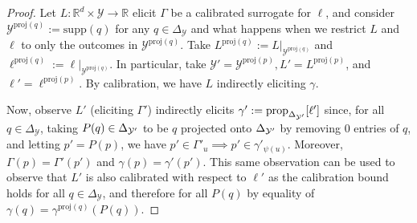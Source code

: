 \documentclass[anon,12pt]{colt2021} %
\newcommand{\reals}{\mathbb{R}}
\newcommand{\simplex}{\Delta_\Y}
\newcommand{\prop}[2][\mathcal{P}]{\mathrm{prop}_{#1}[#2]}
\newcommand{\proj}{\mathrm{proj}}
\newcommand{\supp}{\mathrm{supp}}
\newcommand{\Y}{\mathcal{Y}}
\begin{document}
\hariresult*
\begin{proof}
	Let $L : \reals^d \times \Y \to \reals$ elicit $\Gamma$ be a calibrated surrogate for $\ell$, and consider $\Y^{\proj(q)} := \supp(q)$ for any $q \in \simplex$ and what happens when we restrict $L$ and $\ell$ to only the outcomes in $\Y^{\proj(q)}$.
	Take $L^{\proj(q)} := L|_{\Y^{\proj(q)}}$ and $\ell^{\proj(q)} := \ell|_{\Y^{\proj(q)}}$.
	In particular, take $\Y' = \Y^{\proj(p)}, L' = L^{\proj(p)}$, and $\ell' = \ell^{\proj(p)}$. 
	By calibration, we have $L$ indirectly eliciting $\gamma$.
	
	
	Now, observe $L'$ (eliciting $\Gamma'$) indirectly elicits $\gamma' := \prop[\simplexp]{\ell'}$ since, for all $q \in \simplex$, taking $P(q) \in \simplexp$ to be $q$ projected onto $\simplexp$ by removing $0$ entries of $q$, and letting $p' = P(p)$, we have $p' \in \Gamma'_u \implies p' \in \gamma'_{\psi(u)}$.
	Moreover, $\Gamma(p) = \Gamma'(p')$ and $\gamma(p) = \gamma'(p')$.
	This same observation can be used to observe that $L'$ is also calibrated with respect to $\ell'$ as the calibration bound holds for all $q \in \simplex$, and therefore for all $P(q)$ by equality of $\gamma(q) = \gamma^{\proj(q)}(P(q))$.
	

\end{proof}
\end{document}
